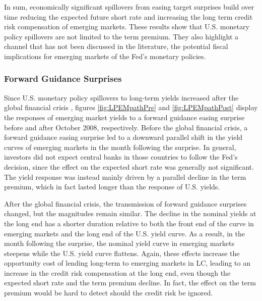 {%
In sum, economically significant spillovers from easing target surprises build over time reducing the expected future short rate and increasing the long term credit risk compensation of emerging markets.
These results show that U.S. monetary policy spillovers 
are not limited to the term premium.
They also highlight a channel that has not been discussed in the literature, the potential fiscal implications for emerging markets of the Fed's monetary policies. 


\subsubsection{Forward Guidance Surprises}
\iftoggle{toclinks}{\gototoc}{} %

Since U.S. monetary policy spillovers to long-term yields increased after the global financial crisis \citep{Albaglietal:2019}, figures \ref{fig:LPEMpathPre} and \ref{fig:LPEMpathPost} display the responses of emerging market yields to a forward guidance easing surprise before and after October 2008, respectively.
Before the global financial crisis, a forward guidance easing surprise led to a downward parallel shift in the yield curves of emerging markets in the month following the surprise.
In general, investors did not expect central banks in those countries to follow the Fed's decision, since the effect on the expected short rate was generally not significant. 
The yield response was instead mainly driven by a parallel decline in the term premium, which in fact lasted longer than the response of U.S. yields.

After the global financial crisis, the transmission of forward guidance surprises changed, but %
the magnitudes remain similar.
The decline in the nominal yields at the long end has a shorter duration relative to both 
the front end of the curve in emerging markets and the long end of the U.S. yield curve. 
As a result, in the month following the surprise, 
the nominal yield curve in emerging markets steepens while the U.S. yield curve flattens. 
Again, these effects increase the opportunity cost of lending long-term to emerging markets in LC, leading to an increase in the credit risk compensation at the long end, even though the expected short rate and the term premium decline. In fact, the effect on the term premium would be hard to detect should the credit risk be ignored.

}
